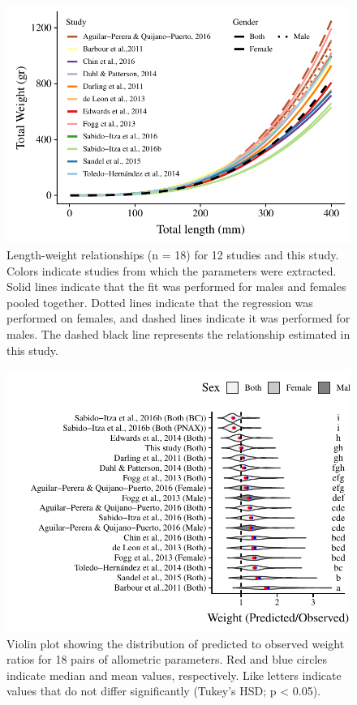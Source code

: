 \documentclass[fleqn,10pt,lineno]{wlpeerj} %
\begin{document}
\begin{figure}
\centering
\includegraphics{Manuscript_files/figure-latex/unnamed-chunk-6-1.pdf}
\caption{\label{fig:all_allo}Length-weight relationships (n = 18) for 12
studies and this study. Colors indicate studies from which the
parameters were extracted. Solid lines indicate that the fit was
performed for males and females pooled together. Dotted lines indicate
that the regression was performed on females, and dashed lines indicate
it was performed for males. The dashed black line represents the
relationship estimated in this study.}
\end{figure}

\begin{figure}
\centering
\includegraphics{Manuscript_files/figure-latex/unnamed-chunk-7-1.pdf}
\caption{\label{fig:bio_ratio}Violin plot showing the distribution of
predicted to observed weight ratios for 18 pairs of allometric
parameters. Red and blue circles indicate median and mean values,
respectively. Like letters indicate values that do not differ
significantly (Tukey's HSD; p \textless{} 0.05).}
\end{figure}
\end{document}
